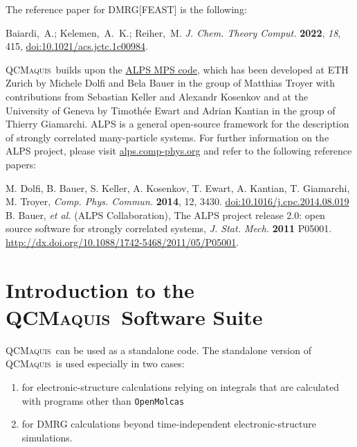 \documentclass[bibliography=totoc,12pt,a4paper]{scrartcl}
\newcommand{\qcm}{\textsc{QCMaquis}}
\begin{document}
The reference paper for DMRG[FEAST] is the following:

\begin{framed}
  \noindent Baiardi,~A.; Kelemen,~A.~K.; Reiher,~M. \emph{J. Chem. Theory Comput.} \textbf{2022}, \emph{18}, 415, \href{https://doi.org/10.1021/acs.jctc.1c00984}{doi:10.1021/acs.jctc.1c00984}.
\end{framed}

\qcm\ builds upon the \href{http://alps.comp-phys.org/static/mps\_doc/index.html}{ALPS MPS code}, which has been developed at ETH Zurich by Michele Dolfi and Bela Bauer in the group of Matthias Troyer with contributions from Sebastian Keller and Alexandr Kosenkov and at the University of Geneva by Timoth{\'e}e Ewart and Adrian Kantian in the group of Thierry Giamarchi.
ALPS is a general open-source framework for the description of strongly correlated many-particle systems.
For further information on the ALPS project, please visit \href{alps.comp-phys.org}{alps.comp-phys.org} and refer to the following reference papers:

\begin{framed}
  \noindent M. Dolfi, B. Bauer, S. Keller, A. Kosenkov, T. Ewart, A. Kantian, T. Giamarchi, M. Troyer, \textit{Comp. Phys. Commun.} \textbf{2014}, 12, 3430. \href{https://doi.org/10.1016/j.cpc.2014.08.019}{doi:10.1016/j.cpc.2014.08.019} \\
  B. Bauer, \textit{et al.} (ALPS Collaboration), The ALPS project release 2.0: open source software for strongly correlated systems, \textit{J. Stat. Mech.} \textbf{2011} P05001. \href{http://dx.doi.org/10.1088/1742-5468/2011/05/P05001}{http://dx.doi.org/10.1088/1742-5468/2011/05/P05001}.
\end{framed}

\clearpage
\tableofcontents
\clearpage


\section{Introduction to the \qcm\ Software Suite}

\qcm\ can be used as a standalone code.
The standalone version of \qcm\ is used especially in two cases: 

\begin{enumerate}
  \item for electronic-structure calculations relying on integrals that are calculated with programs other than \texttt{OpenMolcas}
  \item for DMRG calculations beyond time-independent electronic-structure simulations.
\end{enumerate}
\end{document}
